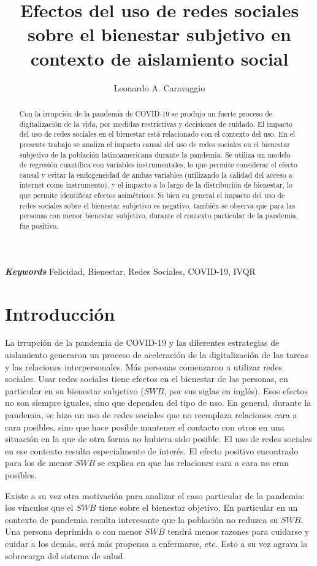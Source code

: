 \documentclass[11pt]{article}
\title{Efectos del uso de redes sociales sobre el bienestar subjetivo en contexto de aislamiento social}
\author{Leonardo A. Caravaggio}
\date{}
\providecommand{\keywords}[1]
{
  \small	
  \textbf{\textit{Keywords}} #1
}
\begin{document}
\maketitle

\begin{abstract}
Con la irrupción de la pandemia de COVID-19 se produjo un fuerte proceso de digitalización de la vida, por medidas restrictivas y decisiones de cuidado. El impacto del uso de redes sociales en el bienestar está relacionado con el contexto del uso. En el presente trabajo se analiza el impacto causal del uso de redes sociales en el bienestar subjetivo de la población latinoamericana durante la pandemia. Se utiliza un modelo de regresión cuantílica con variables instrumentales, lo que permite considerar el efecto causal y evitar la endogeneidad de ambas variables (utilizando la calidad del acceso a internet como instrumento), y el impacto a lo largo de la distribución de bienestar, lo que permite identificar efectos asimétricos. Si bien en general el impacto del uso de redes sociales sobre el bienestar subjetivo es negativo, también se observa que para las personas con menor bienestar subjetivo, durante el contexto particular de la pandemia, fue positivo. 
\end{abstract}

\keywords{Felicidad, Bienestar, Redes Sociales, COVID-19, IVQR}

\section{Introducción}
La irrupción de la pandemia de COVID-19 y las diferentes estrategias de aislamiento generaron un proceso de aceleración de la digitalización de las tareas y las relaciones interpersonales. Más personas comenzaron a utilizar redes sociales. Usar redes sociales tiene efectos en el bienestar de las personas, en particular en su bienestar subjetivo ($SWB$, por sus siglas en inglés). Esos efectos no son siempre iguales, sino que dependen del tipo de uso. En general, durante la pandemia, se hizo un uso de redes sociales que no reemplaza relaciones cara a cara posibles, sino que hace posible mantener el contacto con otros en una situación en la que de otra forma no hubiera sido posible. El uso de redes sociales en ese contexto resulta especialmente de interés. El efecto positivo encontrado para los de menor $SWB$ se explica en que las relaciones cara a cara no eran posibles. 

Existe a su vez otra motivación para analizar el caso particular de la pandemia: los vínculos que el $SWB$ tiene sobre el bienestar objetivo. En particular en un contexto de pandemia resulta interesante que la población no reduzca su $SWB$. Una persona deprimida o con menor $SWB$ tendrá menos razones para cuidarse y cuidar a los demás, será más propensa a enfermarse, etc. Esto a su vez agrava la sobrecarga del sistema de salud. 
\end{document}
